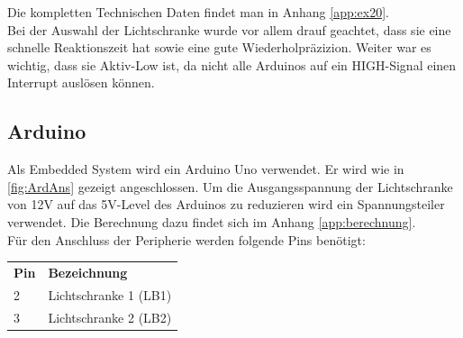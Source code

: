 Die kompletten Technischen Daten findet man in Anhang \ref{app:ex20}.\\

Bei der Auswahl der Lichtschranke wurde vor allem drauf geachtet, dass sie eine schnelle Reaktionszeit hat sowie eine gute Wiederholpräzizion. Weiter war es wichtig, dass sie Aktiv-Low ist, da nicht alle Arduinos auf ein HIGH-Signal einen Interrupt auslösen können.\\
\clearpage

\subsection{Arduino}
Als  Embedded System wird ein Arduino Uno verwendet. Er wird wie in \ref{fig:ArdAns} gezeigt angeschlossen. Um die Ausgangsspannung der Lichtschranke von 12V auf das 5V-Level des Arduinos zu reduzieren wird ein Spannungsteiler verwendet. Die Berechnung dazu findet sich im Anhang \ref{app:berechnung}.\\


Für den Anschluss der Peripherie werden folgende Pins benötigt:\newline
\begin{tabular}{ll}
    \textbf{Pin} & \textbf{Bezeichnung}\\
    2 & Lichtschranke 1 (LB1)\\
    3 & Lichtschranke 2 (LB2)\\
\end{tabular}

